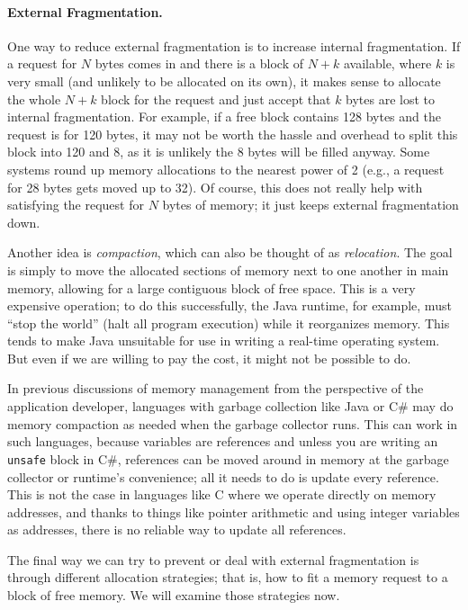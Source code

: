 \paragraph{External Fragmentation.}
One way to reduce external fragmentation is to increase internal fragmentation. If a request for $N$ bytes comes in and there is a block of $N+k$ available, where $k$ is very small (and unlikely to be allocated on its own), it makes sense to allocate the whole $N+k$ block for the request and just accept that $k$ bytes are lost to internal fragmentation. For example, if a free block contains 128 bytes and the request is for 120 bytes, it may not be worth the hassle and overhead to split this block into 120 and 8, as it is unlikely the 8 bytes will be filled anyway. Some systems round up memory allocations to the nearest power of 2 (e.g., a request for 28 bytes gets moved up to 32). Of course, this does not really help with satisfying the request for $N$ bytes of memory; it just keeps external fragmentation down.

Another idea is \textit{compaction}, which can also be thought of as \textit{relocation}. The goal is simply to move the allocated sections of memory next to one another in main memory, allowing for a large contiguous block of free space. This is a very expensive operation; to do this successfully, the Java runtime, for example, must ``stop the world'' (halt all program execution) while it reorganizes memory. This tends to make Java unsuitable for use in writing a real-time operating system. But even if we are willing to pay the cost, it might not be possible to do.

In previous discussions of memory management from the perspective of the application developer, languages with garbage collection like Java or C\# may do memory compaction as needed when the garbage collector runs. This can work in such languages, because variables are references and unless you are writing an \texttt{unsafe} block in C\#, references can be moved around in memory at the garbage collector or runtime's convenience; all it needs to do is update every reference. This is not the case in languages like C where we operate directly on memory addresses, and thanks to things like pointer arithmetic and using integer variables as addresses, there is no reliable way to update all references. 

The final way we can try to prevent or deal with external fragmentation is through different allocation strategies; that is, how to fit a memory request to a block of free memory. We will examine those strategies now.

